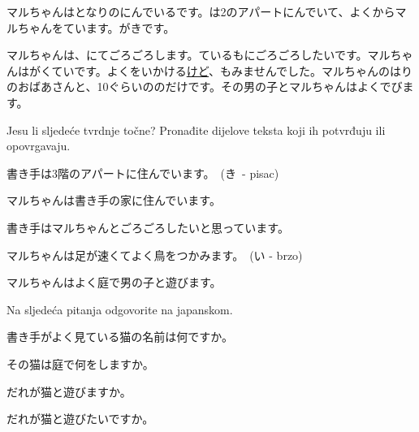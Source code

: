 
\author{Tomislav Mamić}

	
	
	マルちゃんはとなりのにんでいるです。は2のアパートにんでいて、よくからマルちゃんをています。がきです。
	
	マルちゃんは、\hspace{10pt}にてごろごろします。ているも\hspace{10pt}にごろごろしたいです。マルちゃんはがくていです。よくをいかける\underline{けど}、もみませんでした。マルちゃんのはりのおばあさんと、10ぐらいののだけです。その男の子とマルちゃんはよくでびます。
	
	\vspace{20pt}
	\begin{mondai}{Jesu li sljedeće tvrdnje točne? Pronađite dijelove teksta koji ih potvrđuju ili opovrgavaju.}
		\item 書き手は3階のアパートに住んでいます。　(き\ - pisac)
		\item マルちゃんは書き手の家に住んでいます。
		\item 書き手はマルちゃんとごろごろしたいと思っています。
		\vspace{3pt}
		\item マルちゃんは足が速くてよく鳥をつかみます。　(い - brzo)
		\item マルちゃんはよく庭で男の子と遊びます。
	\end{mondai}

	\begin{mondai}{Na sljedeća pitanja odgovorite na japanskom.}
		\item 書き手がよく見ている猫の名前は何ですか。
		\item その猫は庭で何をしますか。
		\item だれが猫と遊びますか。
		\item だれが猫と遊びたいですか。
	\end{mondai}
